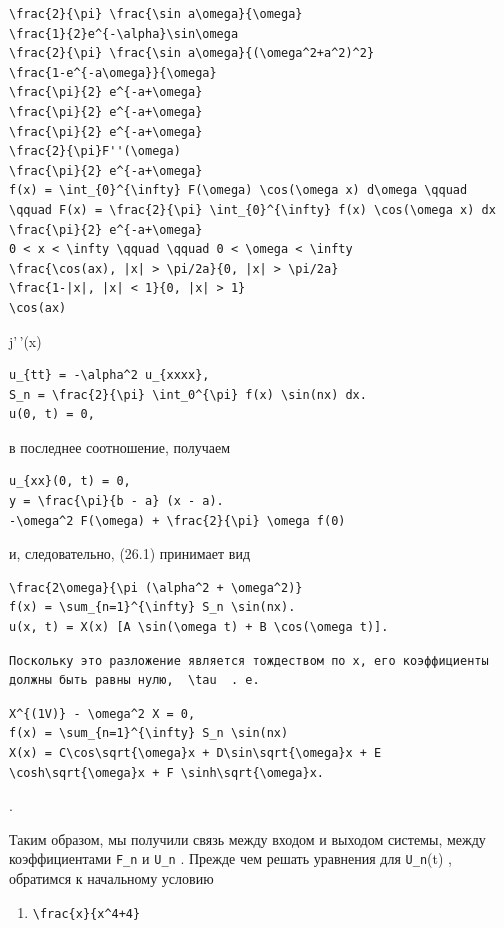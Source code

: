 \documentclass[
  ukrainian,
]{article}
\providecommand{\tightlist}{%
  \setlength{\itemsep}{0pt}\setlength{\parskip}{0pt}}
\begin{document}
\begin{verbatim}
\frac{2}{\pi} \frac{\sin a\omega}{\omega}
\frac{1}{2}e^{-\alpha}\sin\omega
\frac{2}{\pi} \frac{\sin a\omega}{(\omega^2+a^2)^2}
\frac{1-e^{-a\omega}}{\omega}
\frac{\pi}{2} e^{-a+\omega}
\frac{\pi}{2} e^{-a+\omega}
\frac{\pi}{2} e^{-a+\omega}
\frac{2}{\pi}F''(\omega)
\frac{\pi}{2} e^{-a+\omega}
f(x) = \int_{0}^{\infty} F(\omega) \cos(\omega x) d\omega \qquad \qquad F(x) = \frac{2}{\pi} \int_{0}^{\infty} f(x) \cos(\omega x) dx
\frac{\pi}{2} e^{-a+\omega}
0 < x < \infty \qquad \qquad 0 < \omega < \infty
\frac{\cos(ax), |x| > \pi/2a}{0, |x| > \pi/2a}
\frac{1-|x|, |x| < 1}{0, |x| > 1}
\cos(ax)
\end{verbatim}

j'\,'(x)

\begin{verbatim}
u_{tt} = -\alpha^2 u_{xxxx},
S_n = \frac{2}{\pi} \int_0^{\pi} f(x) \sin(nx) dx.
u(0, t) = 0,
\end{verbatim}

в последнее соотношение, получаем

\begin{verbatim}
u_{xx}(0, t) = 0,
y = \frac{\pi}{b - a} (x - a).
-\omega^2 F(\omega) + \frac{2}{\pi} \omega f(0)
\end{verbatim}

и, следовательно, (26.1) принимает вид

\begin{verbatim}
\frac{2\omega}{\pi (\alpha^2 + \omega^2)}
f(x) = \sum_{n=1}^{\infty} S_n \sin(nx).
u(x, t) = X(x) [A \sin(\omega t) + B \cos(\omega t)].
\end{verbatim}

\begin{verbatim}
Поскольку это разложение является тождеством по x, его коэффициенты должны быть равны нулю,  \tau  . е.
\end{verbatim}

\begin{verbatim}
X^{(1V)} - \omega^2 X = 0,
f(x) = \sum_{n=1}^{\infty} S_n \sin(nx)
X(x) = C\cos\sqrt{\omega}x + D\sin\sqrt{\omega}x + E \cosh\sqrt{\omega}x + F \sinh\sqrt{\omega}x.
\end{verbatim}

.

Таким образом, мы получили связь между входом и выходом системы, между
коэффициентами \texttt{F\_n} и \texttt{U\_n} . Прежде чем решать
уравнения для \texttt{U\_n}(t) , обратимся к начальному условию

\begin{enumerate}
\def\labelenumi{\arabic{enumi}.}
\setcounter{enumi}{7}
\tightlist
\item
  \texttt{\textbackslash{}frac\{x\}\{x\^{}4+4\}}
\end{enumerate}
\end{document}
